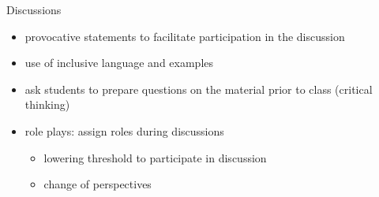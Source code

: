 \begin{frame}{Discussions}
	\pause
	\begin{itemize}[<+->]
		\item provocative statements to \alert{facilitate participation} in the discussion
		\item use of inclusive language and examples
		\item ask students to prepare questions on the material prior to class	(\alert{critical thinking})	
		\item \alert{role plays}: assign roles during discussions
		\begin{itemize}
			\item lowering threshold to participate in discussion
			\item \alert{change of perspectives}
		\end{itemize}
	\end{itemize}
\end{frame}


